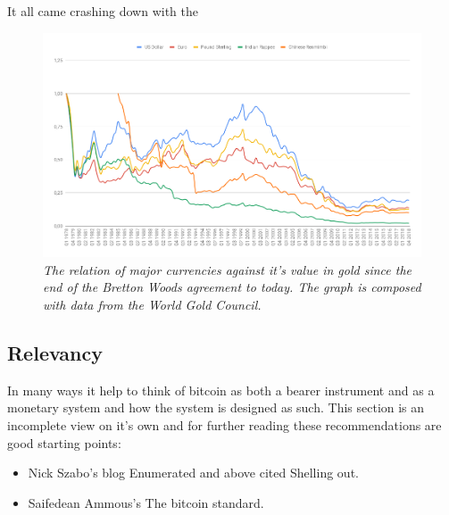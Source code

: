 It all came crashing down with the 



\newpage
\onecolumn
\begin{figure}[!htb]
	\centering
	\includegraphics[width=16cm]{gold-price.png}
	\caption{\textit{The relation of major currencies against it's value in gold since the end of the Bretton Woods agreement to
			today. The graph is composed with data from the World Gold Council\cite{world:gold:council}. 
	}}
	\label{fig:seb:promissory:note}
\end{figure}
\twocolumn


\subsection{Relevancy}
In many ways it help to think of bitcoin
as both a bearer instrument and as a monetary system and how the 
system is designed as such. This
section is an incomplete view on it's own and for
further reading these recommendations are good starting points: 

\begin{itemize}
	\item Nick Szabo's blog Enumerated and above cited Shelling out\cite{szabo:shelling:out}.
	\item Saifedean Ammous's The bitcoin standard.\cite{ammous:bitcoin:standard}
\end{itemize}


